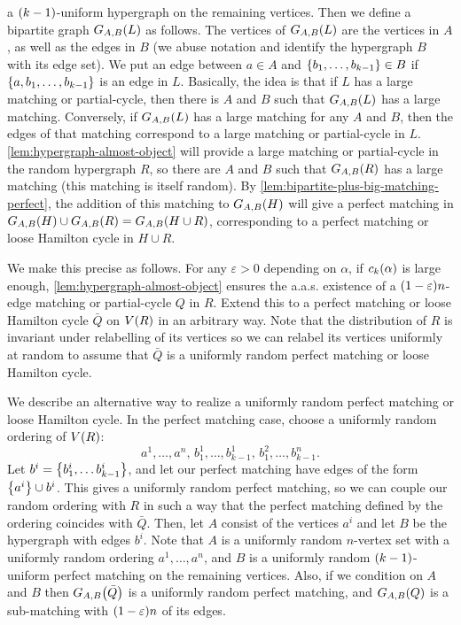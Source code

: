 \documentclass[11pt,english]{article}
\theoremstyle{plain}
\theoremstyle{definition}
\theoremstyle{definition}
\theoremstyle{plain}
\theoremstyle{plain}
\theoremstyle{plain}
\theoremstyle{plain}
\theoremstyle{remark}
\theoremstyle{remark}
\let\originalleft\left
\let\originalright\right
\renewcommand{\left}{\mathopen{}\mathclose\bgroup\originalleft}
\renewcommand{\right}{\aftergroup\egroup\originalright}
\begin{document}
a $\left(k-1\right)$-uniform hypergraph on the remaining vertices.
Then we define a bipartite graph $G_{A,B}\left(L\right)$ as follows.
The vertices of $G_{A,B}\left(L\right)$ are the vertices in $A$,
as well as the edges in $B$ (we abuse notation and identify the hypergraph
$B$ with its edge set). We put an edge between $a\in A$ and $\left\{ b_{1},\dots,b_{k-1}\right\} \in B$
if $\left\{ a,b_{1},\dots,b_{k-1}\right\} $ is an edge in $L$. Basically,
the idea is that if $L$ has a large matching or partial-cycle, then there
is $A$ and $B$ such that $G_{A,B}\left(L\right)$ has a large matching. Conversely,
if $G_{A,B}\left(L\right)$ has a large matching for any $A$
and $B$, then the edges of that matching correspond to a large matching or partial-cycle in $L$. \ref{lem:hypergraph-almost-object}
will provide a large matching or partial-cycle in the random hypergraph $R$, so there are $A$
and $B$ such that $G_{A,B}\left(R\right)$ has a large matching (this matching is itself random).
By \ref{lem:bipartite-plus-big-matching-perfect}, the addition of
this matching to $G_{A,B}\left(H\right)$ will give a perfect
matching in $G_{A,B}\left(H\right)\cup G_{A,B}\left(R\right)=G_{A,B}\left(H\cup R\right)$,
corresponding to a perfect matching or loose Hamilton cycle in $H\cup R$.

We make this precise as follows. For any $\varepsilon>0$ depending on $\alpha$, if $\chyp\left(\alpha\right)$
is large enough, \ref{lem:hypergraph-almost-object} ensures the a.a.s.{}
existence of a $\left(1-\varepsilon\right)n$-edge matching or partial-cycle $Q$ in $R$. Extend this to a perfect matching or loose Hamilton cycle
$\bar{Q}$ on $V\left(R\right)$ in an arbitrary way. Note that the distribution of $R$
is invariant under relabelling of its vertices so we can relabel its
vertices uniformly at random to assume that $\bar{Q}$ is a uniformly
random perfect matching or loose Hamilton cycle.

We describe an alternative way to realize a uniformly random perfect
matching or loose Hamilton cycle. In the perfect matching case, choose a
uniformly random ordering of $V\left(R\right)$: 
\[
a^{1},\dots,a^{n},\, b_{1}^{1},\dots,b_{k-1}^{1},\, b_{1}^{2},\dots,b_{k-1}^{n}.
\]
Let $b^{i}=\left\{ b_{1}^{i},\dots b_{k-1}^{i}\right\}$, and let our perfect matching have edges of the form $\left\{a^{i}\right\}\cup b^i $.
This gives a uniformly random perfect matching, so we can couple our
random ordering with $R$ in such a way that the perfect matching
defined by the ordering coincides with $\bar{Q}$. Then, let $A$
consist of the vertices $a^{i}$ and let $B$ be the hypergraph with
edges $b^i$.
Note that $A$ is a uniformly random $n$-vertex set with a uniformly random ordering $a^{1},\dots,a^{n}$, and $B$ is a
uniformly random $\left(k-1\right)$-uniform perfect matching on the remaining vertices. Also,
if we condition on $A$ and $B$ then $G_{A,B}\left(\bar{Q}\right)$
is a uniformly random perfect matching, and $G_{A,B}\left(Q\right)$
is a sub-matching with $\left(1-\varepsilon\right)n$ of its edges.
\end{document}

